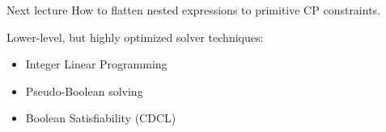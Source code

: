 \documentclass{cons-beamer}
\begin{document}

\begin{frame}{Next lecture}
	How to flatten nested expressions to primitive CP constraints.
	\vfill
	
	Lower-level, but highly optimized solver techniques:
	\begin{itemize}
		\item Integer Linear Programming
		\item Pseudo-Boolean solving
		\item Boolean Satisfiability (CDCL)
	\end{itemize}
	
\end{frame}
\end{document}
